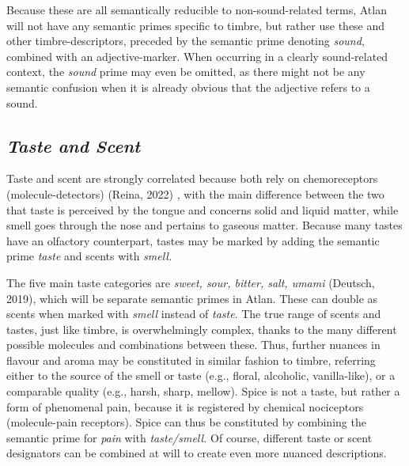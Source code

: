 Because these are all semantically reducible to non-sound-related terms, Atlan will not have any semantic primes specific to timbre, but rather use these and other timbre-descriptors, preceded by the semantic prime denoting \textit{sound}, combined with an adjective-marker. When occurring in a clearly sound-related context, the \textit{sound} prime may even be omitted, as there might not be any semantic confusion when it is already obvious that the adjective refers to a sound. 


\subsection{\it Taste and Scent}

\noindent Taste and scent are strongly correlated because both rely on chemoreceptors (molecule-detectors) (Reina, 2022) , with the main difference between the two that taste is perceived by the tongue and concerns solid and liquid matter, while smell goes through the nose and pertains to gaseous matter. Because many tastes have an olfactory counterpart, tastes may be marked by adding the semantic prime \textit{taste} and scents with \textit{smell.} 

The five main taste categories are \textit{sweet, sour, bitter, salt, umami}  (Deutsch, 2019), which will be separate semantic primes in Atlan. These can double as scents when marked with \textit{smell} instead of \textit{taste}. The true range of scents and tastes, just like timbre, is overwhelmingly complex, thanks to the many different possible molecules and combinations between these. Thus, further nuances in flavour and aroma may be constituted in similar fashion to timbre, referring either to the source of the smell or taste (e.g., floral, alcoholic, vanilla-like), or a comparable quality (e.g., harsh, sharp, mellow). Spice is not a taste, but rather a form of phenomenal pain, because it is registered by chemical nociceptors (molecule-pain receptors). Spice can thus be constituted by combining the semantic prime for \textit{pain} with \textit{taste/smell.} Of course, different taste or scent designators can be combined at will to create even more nuanced descriptions. 

